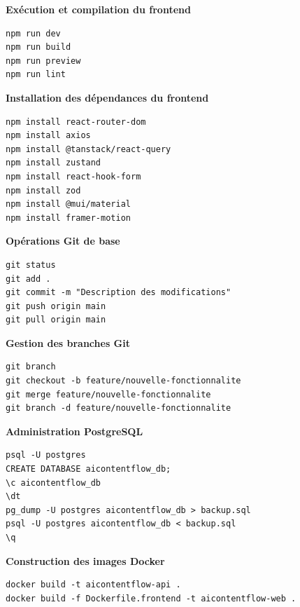\textbf{Exécution et compilation du frontend}

\begin{verbatim}
npm run dev
npm run build
npm run preview
npm run lint
\end{verbatim}

\vspace{0.3cm}

\textbf{Installation des dépendances du frontend}

\begin{verbatim}
npm install react-router-dom
npm install axios
npm install @tanstack/react-query
npm install zustand
npm install react-hook-form
npm install zod
npm install @mui/material
npm install framer-motion
\end{verbatim}

\vspace{0.5cm}

\textbf{Opérations Git de base}

\begin{verbatim}
git status
git add .
git commit -m "Description des modifications"
git push origin main
git pull origin main
\end{verbatim}

\vspace{0.3cm}

\textbf{Gestion des branches Git}

\begin{verbatim}
git branch
git checkout -b feature/nouvelle-fonctionnalite
git merge feature/nouvelle-fonctionnalite
git branch -d feature/nouvelle-fonctionnalite
\end{verbatim}

\vspace{0.5cm}

\textbf{Administration PostgreSQL}

\begin{verbatim}
psql -U postgres
CREATE DATABASE aicontentflow_db;
\c aicontentflow_db
\dt
pg_dump -U postgres aicontentflow_db > backup.sql
psql -U postgres aicontentflow_db < backup.sql
\q
\end{verbatim}

\vspace{0.5cm}

\textbf{Construction des images Docker}

\begin{verbatim}
docker build -t aicontentflow-api .
docker build -f Dockerfile.frontend -t aicontentflow-web .
\end{verbatim}

